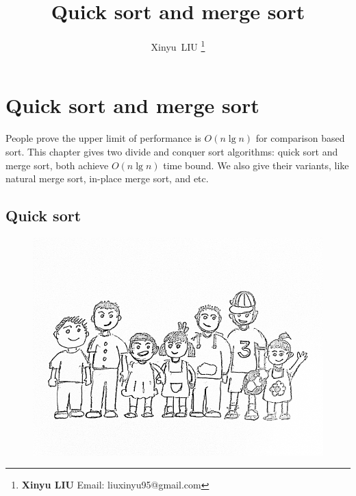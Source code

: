 \documentclass[b5paper]{article}
\begin{document}
\title{Quick sort and merge sort}

\author{Xinyu~LIU
\thanks{{\bfseries Xinyu LIU} \newline
  Email: liuxinyu95@gmail.com \newline}
  }

\maketitle
\fi


\ifx\wholebook\relax
\chapter{Quick sort and merge sort}
\fi

People prove the upper limit of performance is $O(n \lg n)$ for comparison based sort\cite{TAOCP}. This chapter gives two divide and conquer sort algorithms: quick sort and merge sort, both achieve $O(n \lg n)$ time bound. We also give their variants, like natural merge sort, in-place merge sort, and etc.

\section{Quick sort}

\begin{figure}[htbp]
 \centering
 \includegraphics[scale=0.3]{img/kids}
 \captionsetup{labelformat = empty}
 \label{fig:kids-sort}
\end{figure}
\end{document}

